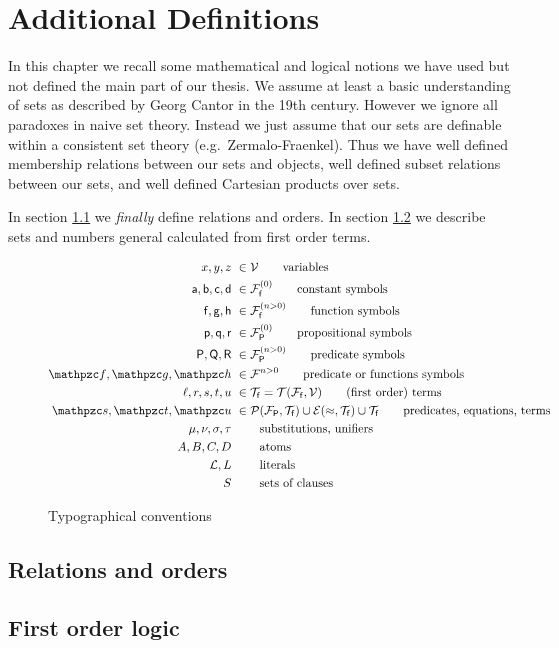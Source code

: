 
\chapter{Additional Definitions}





In this chapter we recall some mathematical and logical notions we have used but not defined the main part of our thesis.
We assume at least a {\myem basic} understanding of sets as described by Georg Cantor in the 19th century. 
However we ignore all paradoxes in {\myem naive} set theory.
Instead we just assume that our sets are definable within a consistent set theory (e.g.~Zermalo-Fraenkel).
Thus we have well defined {\myem membership} relations between our sets and objects,
well defined {\myem subset} relations between our sets, 
and well defined {\myem Cartesian products} over sets.

In section \ref{sec:app:maths} we {\em finally} define {\myem relations} and {\myem orders}. 
In section \ref{sec:app:fol} we describe sets and numbers general calculated from first order terms.

\begin{figure}[hbt]\label{fig:conventions}
	\begin{align*}
	x,y,z &\ \in\mcV \tag*{variables} \\
	\ma,\mb,\mc,\md &\ \in\mcFfn[{0}]\tag*{constant symbols} \\
	\mf, \mg, \mh &\ \in\mcFfn[{n>0}]\tag*{function symbols} \\
	\mpp, \mq, \mr &\ \in\mcFPn[{0}]\tag*{propositional symbols}\\
	\mP, \mQ, \mR &\ \in\mcFPn[{n>0}]\tag*{predicate symbols}\\
	\mcf, \mcg, \mch &\ \in\mcF^{n>0} \tag*{predicate or functions symbols}\\
	\ell, r, s,t,u &\ \in\mcTf = \mcTFfV\tag*{(first order) terms}\\
	\mcs, \mct, \mcu &\ \in \mcPT \cup \mcET \cup \mcTf \tag*{predicates, equations, terms}\\
	\mu, \nu, \sigma, \tau &\ \tag*{substitutions, unifiers}\\
	A,B,C,D &\ \tag*{atoms} \\
	\mcL, L &\ \tag*{literals} \\
	S &\ \tag*{sets of clauses}
	\end{align*}
	\caption{Typographical conventions}
\end{figure}

\section{Relations and orders}\label{sec:app:maths}



\section{First order logic}\label{sec:app:fol}







